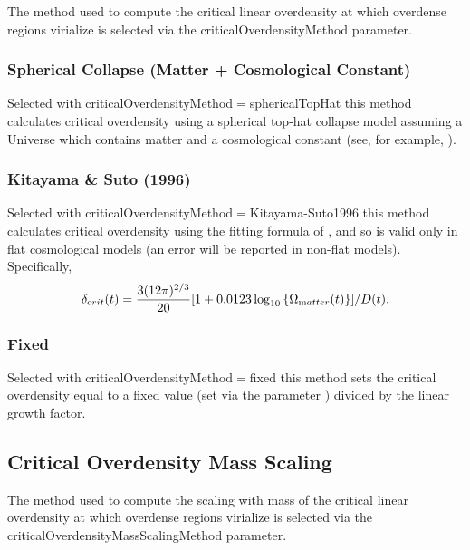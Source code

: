 The method used to compute the critical linear overdensity at which overdense regions virialize is selected via the {\normalfont \ttfamily criticalOverdensityMethod} parameter.

\subsubsection{Spherical Collapse (Matter + Cosmological Constant)}

Selected with {\normalfont \ttfamily criticalOverdensityMethod}$=${\normalfont \ttfamily sphericalTopHat} this method calculates critical overdensity using a spherical top-hat collapse model assuming a Universe which contains matter and a cosmological constant (see, for example, \citealt{percival_cosmological_2005}).

\subsubsection{Kitayama \& Suto (1996)}

Selected with {\normalfont \ttfamily criticalOverdensityMethod}$=${\normalfont \ttfamily Kitayama-Suto1996} this method calculates critical overdensity using the fitting formula of \cite{kitayama_semianalytic_1996}, and so is valid only in flat cosmological models (an error will be reported in non-flat models). Specifically,
\begin{equation}
 \delta_{\mathrm crit} (t) = {3 (12 \pi)^{2/3} \over 20} [1 + 0.0123 \log_{10}\left\{\Omega_{\mathrm matter}(t)\right\}]/D(t).
\end{equation}

\subsubsection{Fixed}

Selected with {\normalfont \ttfamily criticalOverdensityMethod}$=${\normalfont \ttfamily fixed} this method sets the critical overdensity equal to a fixed value (set via the parameter {\normalfont \ttfamily [criticalOverdensityFixed]}) divided by the linear growth factor.

\subsection{Critical Overdensity Mass Scaling}

The method used to compute the scaling with mass of the critical linear overdensity at which overdense regions virialize is selected via the {\normalfont \ttfamily criticalOverdensityMassScalingMethod} parameter.

